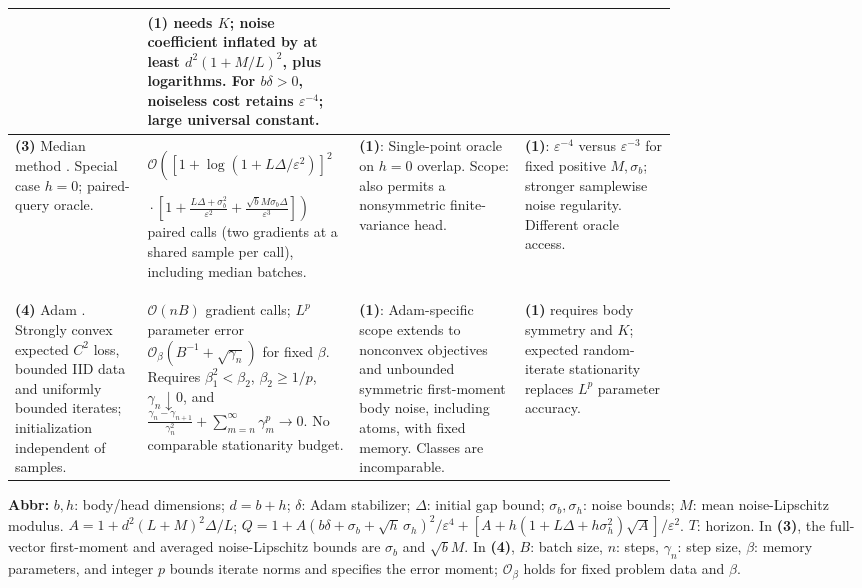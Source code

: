 \begin{table}[tp]
\begin{threeparttable}
\begin{tabularx}{\linewidth}{@{}>{\raggedright\arraybackslash}p{0.20\linewidth}>{\raggedright\arraybackslash}p{0.32\linewidth}>{\raggedright\arraybackslash}p{0.25\linewidth}>{\raggedright\arraybackslash}X@{}}
& \textbf{(1)} needs $K$; noise coefficient inflated by at least $d^2(1+M/L)^2$, plus logarithms. For $b\delta>0$, noiseless cost retains $\varepsilon^{-4}$; large universal constant. \\
\midrule
\textbf{(3)} Median method \citep{hsfmMedianRepository}. Special case $h=0$; paired-query oracle.
& $\mathcal{O}\!\left([1+\log(1+L\Delta/\varepsilon^2)]^2\right.$\par
$\left.{}\cdot\left[1+\frac{L\Delta+\sigma_b^2}{\varepsilon^2}+\frac{\sqrt b M\sigma_b\Delta}{\varepsilon^3}\right]\right)$ paired calls (two gradients at a shared sample per call), including median batches.
& \textbf{(1)}: Single-point oracle on $h=0$ overlap. Scope: also permits a nonsymmetric finite-variance head.
& \textbf{(1)}: $\varepsilon^{-4}$ versus $\varepsilon^{-3}$ for fixed positive $M,\sigma_b$; stronger samplewise noise regularity. Different oracle access. \\
\midrule
\textbf{(4)} Adam \citep[Thm.~1.2]{hsfmDereich2026v2}. Strongly convex expected $C^2$ loss, bounded IID data and uniformly bounded iterates; initialization independent of samples.
& $\mathcal{O}(nB)$ gradient calls; $L^p$ parameter error $\mathcal{O}_{\beta}(B^{-1}+\sqrt{\gamma_n})$ for fixed $\beta$. Requires $\beta_1^2<\beta_2$, $\beta_2\ge1/p$, $\gamma_n\downarrow0$, and
$\frac{\gamma_n-\gamma_{n+1}}{\gamma_n^2}+\sum_{m=n}^{\infty}\gamma_m^p\to0$. No comparable stationarity budget.
& \textbf{(1)}: Adam-specific scope extends to nonconvex objectives and unbounded symmetric first-moment body noise, including atoms, with fixed memory. Classes are incomparable.
& \textbf{(1)} requires body symmetry and $K$; expected random-iterate stationarity replaces $L^p$ parameter accuracy. \\
\bottomrule
\end{tabularx}
\begin{tablenotes}[flushleft]\footnotesize
\item[] \textbf{Abbr:} $b,h$: body/head dimensions; $d=b+h$; $\delta$: Adam stabilizer; $\Delta$: initial gap bound; $\sigma_b,\sigma_h$: noise bounds; $M$: mean noise-Lipschitz modulus.
$A=1+d^2(L+M)^2\Delta/L$;
$Q=1+A(b\delta+\sigma_b+\sqrt h\,\sigma_h)^2/\varepsilon^4+[A+h(1+L\Delta+h\sigma_h^2)\sqrt A]/\varepsilon^2$.
$T$: horizon. In \textbf{(3)}, the full-vector first-moment and averaged noise-Lipschitz bounds are $\sigma_b$ and $\sqrt b M$. In \textbf{(4)}, $B$: batch size, $n$: steps, $\gamma_n$: step size, $\beta$: memory parameters, and integer $p$ bounds iterate norms and specifies the error moment; $\mathcal{O}_{\beta}$ holds for fixed problem data and $\beta$.
\end{tablenotes}
\end{threeparttable}
\end{table}
\clearpage
